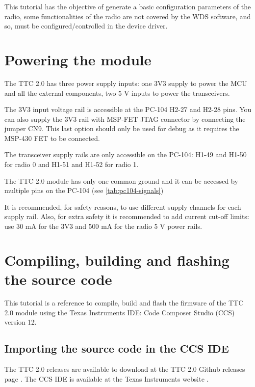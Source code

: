 This tutorial has the objective of generate a basic configuration parameters of the radio, some functionalities of the radio are not covered by the WDS software, and so, must be configured/controlled in the device driver.

\section{Powering the module}

The TTC 2.0 has three power supply inputs: one 3V3 supply to power the MCU and all the external components, two 5 V inputs to power the transceivers.

The 3V3 input voltage rail is accessible at the PC-104 H2-27 and H2-28 pins. You can also supply the 3V3 rail with MSP-FET JTAG connector by connecting the jumper CN9. This last option should only be used for debug as it requires the MSP-430 FET to be connected.

The transceiver supply rails are only accessible on the PC-104: H1-49 and H1-50 for radio 0 and H1-51 and H1-52 for radio 1. 

The TTC 2.0 module has only one common ground and it can be accessed by multiple pins on the PC-104 (see \autoref {tab:pc104-signals})

It is recommended, for safety reasons, to use different supply channels for each supply rail. Also, for extra safety it is recommended to add current cut-off limits: use 30 mA for the 3V3 and 500 mA for the radio 5 V power rails. 

\section{Compiling, building and flashing the source code}

This tutorial is a reference to compile, build and flash the firmware of the TTC 2.0 module using the Texas Instruments IDE: Code Composer Studio (CCS) version 12.


\subsection{Importing the source code in the CCS IDE}

The TTC 2.0 releases are available to download at the TTC 2.0 Github releases page \cite{ttc2-releases}. The CCS IDE is available at the Texas Instruments website \cite{ccs-studio}.

